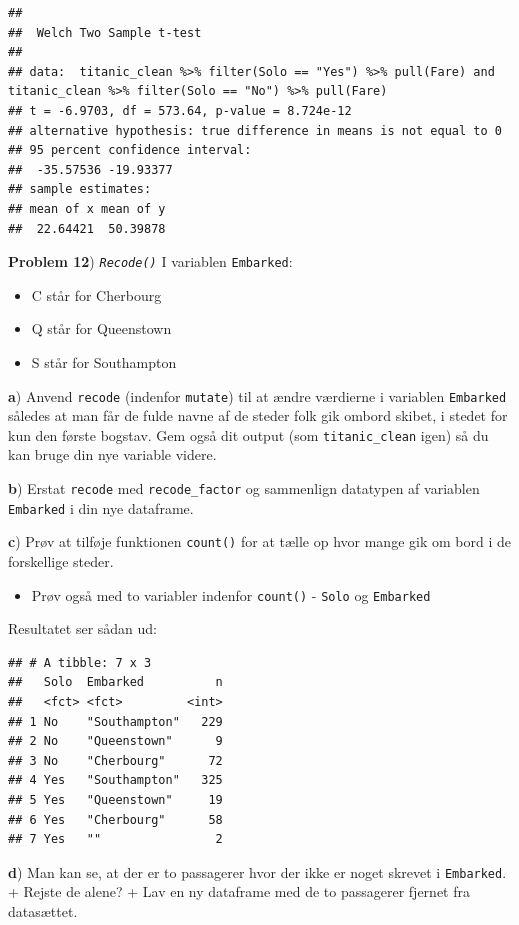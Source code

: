 \documentclass[
]{book}
\providecommand{\tightlist}{%
  \setlength{\itemsep}{0pt}\setlength{\parskip}{0pt}}
\begin{document}
\begin{verbatim}
## 
##  Welch Two Sample t-test
## 
## data:  titanic_clean %>% filter(Solo == "Yes") %>% pull(Fare) and titanic_clean %>% filter(Solo == "No") %>% pull(Fare)
## t = -6.9703, df = 573.64, p-value = 8.724e-12
## alternative hypothesis: true difference in means is not equal to 0
## 95 percent confidence interval:
##  -35.57536 -19.93377
## sample estimates:
## mean of x mean of y 
##  22.64421  50.39878
\end{verbatim}

\textbf{Problem 12}) \emph{\texttt{Recode()}} I variablen \texttt{Embarked}:

\begin{itemize}
\tightlist
\item
  C står for Cherbourg
\item
  Q står for Queenstown
\item
  S står for Southampton
\end{itemize}

\textbf{a}) Anvend \texttt{recode} (indenfor \texttt{mutate}) til at ændre værdierne i variablen \texttt{Embarked} således at man får de fulde navne af de steder folk gik ombord skibet, i stedet for kun den første bogstav. Gem også dit output (som \texttt{titanic\_clean} igen) så du kan bruge din nye variable videre.

\textbf{b}) Erstat \texttt{recode} med \texttt{recode\_factor} og sammenlign datatypen af variablen \texttt{Embarked} i din nye dataframe.

\textbf{c}) Prøv at tilføje funktionen \texttt{count()} for at tælle op hvor mange gik om bord i de forskellige steder.

\begin{itemize}
\tightlist
\item
  Prøv også med to variabler indenfor \texttt{count()} - \texttt{Solo} og \texttt{Embarked}
\end{itemize}

Resultatet ser sådan ud:

\begin{verbatim}
## # A tibble: 7 x 3
##   Solo  Embarked          n
##   <fct> <fct>         <int>
## 1 No    "Southampton"   229
## 2 No    "Queenstown"      9
## 3 No    "Cherbourg"      72
## 4 Yes   "Southampton"   325
## 5 Yes   "Queenstown"     19
## 6 Yes   "Cherbourg"      58
## 7 Yes   ""                2
\end{verbatim}

\textbf{d}) Man kan se, at der er to passagerer hvor der ikke er noget skrevet i \texttt{Embarked}.
+ Rejste de alene?
+ Lav en ny dataframe med de to passagerer fjernet fra datasættet.
\end{document}
